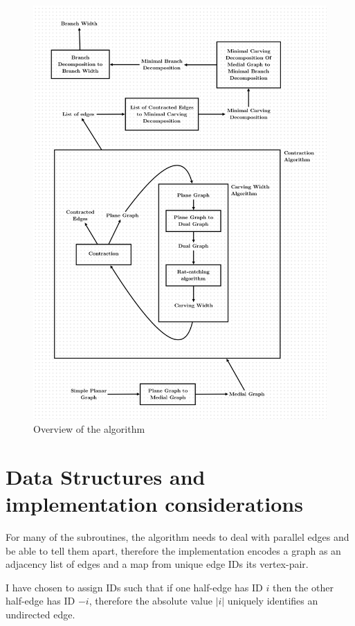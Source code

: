\documentclass{article}
\begin{document}
	\begin{figure}[H]
		\centering
		\includegraphics[width=\textwidth]{./images/overview.png}
		\caption{Overview of the algorithm}
		\label{fig:overview}
	\end{figure}

\section{Data Structures and implementation considerations}

	For many of the subroutines, the algorithm needs to deal with parallel edges and be able to tell them apart, therefore the implementation encodes a graph as an adjacency list of edges and a map from unique edge IDs its vertex-pair.

	I have chosen to assign IDs such that if one half-edge has ID $i$ then the other half-edge has ID $-i$, therefore the absolute value $|i|$ uniquely identifies an undirected edge.
\end{document}
